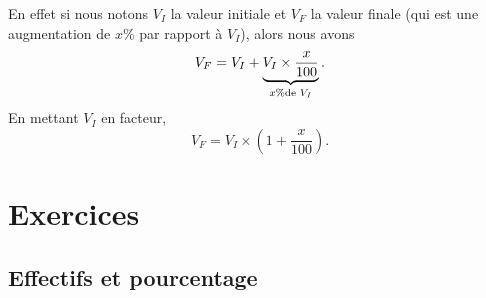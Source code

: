 En effet si nous notons \( V_I\) la valeur initiale et \( V_F\) la valeur finale (qui est une augmentation de \( x\%\) par rapport à \( V_I\)), alors nous avons
\begin{equation}
    V_F=V_I+\underbrace{V_I\times \frac{ x }{ 100 }}_{x\% \text{de \( V_I\)}}.
\end{equation}
En mettant \( V_I\) en facteur,
\begin{equation}
    V_F=V_I\times \left( 1+\frac{ x }{ 100 } \right).
\end{equation}

\section{Exercices}

\subsection{Effectifs et pourcentage}



